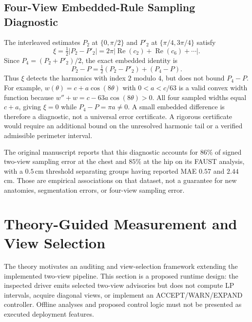 \documentclass[journal]{IEEEtran}
\begin{document}
\subsection{Four-View Embedded-Rule Sampling Diagnostic}
\label{subsec:sampling_certificate}
The interleaved estimates $P_2$ at $\{0,\pi/2\}$ and $P'_2$ at $\{\pi/4,3\pi/4\}$ satisfy
\begin{equation}
\xi=\tfrac12|P_2-P'_2|=2\pi|\operatorname{Re}(c_2)+\operatorname{Re}(c_6)+\cdots|.
\label{eq:certificate}
\end{equation}
Since $P_4=(P_2+P'_2)/2$, the exact embedded identity is
\begin{equation}
P_2-P=\tfrac12(P_2-P'_2)+(P_4-P).
\label{eq:embedded_pair}
\end{equation}
Thus $\xi$ detects the harmonics with index $2$ modulo $4$, but does not bound $P_4-P$. For example, $w(\theta)=c+a\cos(8\theta)$ with $0<a<c/63$ is a valid convex width function because $w''+w=c-63a\cos(8\theta)>0$. All four sampled widths equal $c+a$, giving $\xi=0$ while $P_4-P=\pi a\ne0$. A small embedded difference is therefore a diagnostic, not a universal error certificate. A rigorous certificate would require an additional bound on the unresolved harmonic tail or a verified admissible perimeter interval.

The original manuscript reports that this diagnostic accounts for $86\%$ of signed two-view sampling error at the chest and $85\%$ at the hip on its FAUST analysis, with a $0.5$\,cm threshold separating groups having reported MAE $0.57$ and $2.44$\,cm. Those are empirical associations on that dataset, not a guarantee for new anatomies, segmentation errors, or four-view sampling error.

\section{Theory-Guided Measurement and View Selection}
\label{sec:theory_guided_measurement}
The theory motivates an auditing and view-selection framework extending the implemented two-view pipeline. This section is a proposed runtime design: the inspected driver emits selected two-view advisories but does not compute LP intervals, acquire diagonal views, or implement an ACCEPT/WARN/EXPAND controller. Offline analyses and proposed control logic must not be presented as executed deployment features.
\end{document}
